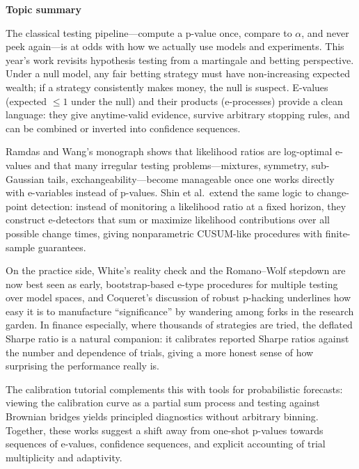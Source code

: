 \documentclass[a5paper]{article}
\let\leq\leqslant
\def\subsection#1{{\par\bigskip\goodbreak\large\bfseries #1\par}}
\begin{document}
\subsection{Topic summary}\label{topic-summary}

The classical testing pipeline---compute a p-value once, compare to $\alpha$,
and never peek again---is at odds with how we actually use models and
experiments. This year's work revisits hypothesis testing from a
martingale and betting perspective. Under a null model, any fair betting
strategy must have non-increasing expected wealth; if a strategy
consistently makes money, the null is suspect. E-values (expected $\leq 1$
under the null) and their products (e-processes) provide a clean
language: they give anytime-valid evidence, survive arbitrary stopping
rules, and can be combined or inverted into confidence sequences.

Ramdas and Wang's monograph shows that likelihood ratios are log-optimal
e-values and that many irregular testing problems---mixtures, symmetry,
sub-Gaussian tails, exchangeability---become manageable once one works
directly with e-variables instead of p-values. Shin et al.~extend the
same logic to change-point detection: instead of monitoring a likelihood
ratio at a fixed horizon, they construct e-detectors that sum or
maximize likelihood contributions over all possible change times, giving
nonparametric CUSUM-like procedures with finite-sample guarantees.

On the practice side, White's reality check and the Romano--Wolf
stepdown are now best seen as early, bootstrap-based e-type procedures
for multiple testing over model spaces, and Coqueret's discussion of
robust p-hacking underlines how easy it is to manufacture
``significance'' by wandering among forks in the research garden. In
finance especially, where thousands of strategies are tried, the
deflated Sharpe ratio is a natural companion: it calibrates reported
Sharpe ratios against the number and dependence of trials, giving a more
honest sense of how surprising the performance really is.

The calibration tutorial complements this with tools for probabilistic
forecasts: viewing the calibration curve as a partial sum process and
testing against Brownian bridges yields principled diagnostics without
arbitrary binning. Together, these works suggest a shift away from
one-shot p-values towards sequences of e-values, confidence sequences,
and explicit accounting of trial multiplicity and adaptivity.
\end{document}
